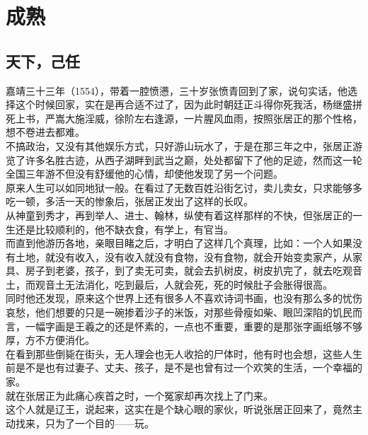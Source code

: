 \section{成熟}
\ifnum{}
	\begin{multicols}{\theparacolNo}
\fi
\subsection{天下，己任}
嘉靖三十三年（1554），带着一腔愤懑，三十岁张愤青回到了家，说句实话，他选择这个时候回家，实在是再合适不过了，因为此时朝廷正斗得你死我活，杨继盛拼死上书，严嵩大施淫威，徐阶左右逢源，一片腥风血雨，按照张居正的那个性格，想不卷进去都难。\\

不搞政治，又没有其他娱乐方式，只好游山玩水了，于是在那三年之中，张居正游览了许多名胜古迹，从西子湖畔到武当之巅，处处都留下了他的足迹，然而这一轮全国三年游不但没有舒缓他的心情，却使他发现了另一个问题。\\

原来人生可以如同地狱一般。在看过了无数百姓沿街乞讨，卖儿卖女，只求能够多吃一顿，多活一天的惨象后，张居正发出了这样的长叹。\\

从神童到秀才，再到举人、进士、翰林，纵使有着这样那样的不快，但张居正的一生还是比较顺利的，他不缺衣食，有学上，有官当。\\

而直到他游历各地，亲眼目睹之后，才明白了这样几个真理，比如：一个人如果没有土地，就没有收入，没有收入就没有食物，没有食物，就会开始变卖家产，从家具、房子到老婆，孩子，到了卖无可卖，就会去扒树皮，树皮扒完了，就去吃观音土，而观音土无法消化，吃到最后，人就会死，死的时候肚子会胀得很高。\\

同时他还发现，原来这个世界上还有很多人不喜欢诗词书画，也没有那么多的忧伤哀愁，他们想要的只是一碗掺着沙子的米饭，对那些骨瘦如柴、眼凹深陷的饥民而言，一幅字画是王羲之的还是怀素的，一点也不重要，重要的是那张字画纸够不够厚，方不方便消化。\\

在看到那些倒毙在街头，无人理会也无人收拾的尸体时，他有时也会想，这些人生前是不是也有过妻子、丈夫、孩子，是不是也曾有过一个欢笑的生活，一个幸福的家。\\

就在张居正为此痛心疾首之时，一个冤家却再次找上了门来。\\

这个人就是辽王，说起来，这实在是个缺心眼的家伙，听说张居正回来了，竟然主动找来，只为了一个目的——玩。\\


\end{multicols}
